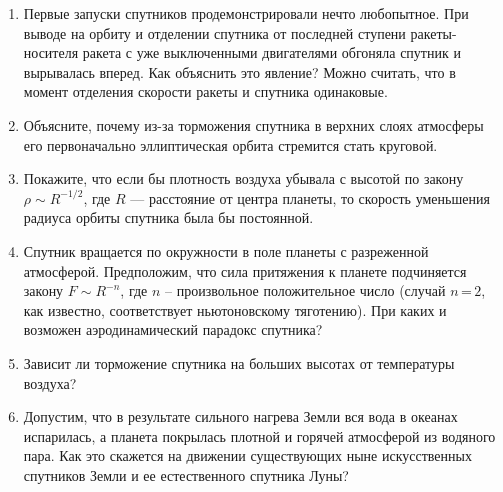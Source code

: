 \begin{multicols}{3}
\begin{enumerate}[label=\textbf{\arabic*}.]
    \item Первые запуски спутников продемонстрировали нечто любопытное. При выводе на орбиту и отделении спутника от последней ступени ракеты-носителя ракета с уже выключенными двигателями обгоняла спутник и вырывалась вперед. Как объяснить это явление? Можно считать, что в момент отделения скорости ракеты и спутника одинаковые.
    \item Объясните, почему из-за торможения спутника в верхних слоях атмосферы его первоначально эллиптическая орбита стремится стать круговой.
    \item Покажите, что если бы плотность воздуха убывала с высотой по закону $\rho \sim R^{-1/2}$, где $R$ — расстояние от центра планеты, то скорость уменьшения радиуса орбиты спутника была бы постоянной.
    \item Спутник вращается по окружности в поле планеты с разреженной атмосферой. Предположим, что сила притяжения к планете подчиняется закону $F \sim R^{-n}$, где $n$ -- произвольное положительное число (случай $n$\,=\,$2$, как известно, соответствует ньютоновскому тяготению). При каких и возможен аэродинамический парадокс спутника?
    \item Зависит ли торможение спутника на больших высотах от температуры воздуха?
    \item Допустим, что в результате сильного нагрева Земли вся вода в океанах испарилась, а планета покрылась плотной и горячей атмосферой из водяного пара. Как это скажется на движении существующих ныне искусственных спутников Земли и ее естественного спутника Луны?
\end{enumerate}

\end{multicols}
